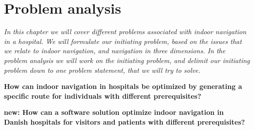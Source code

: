 \chapter{Problem analysis}

\textit{In this chapter we will cover different problems associated with indoor navigation in a hospital. We will formulate our initiating problem, based on the issues that we relate to indoor navigation, and navigation in three dimensions. In the problem analysis we will work on the initiating problem, and delimit our initiating problem down to one problem statement, that we will try to solve.
}

\textbf{How can indoor navigation in hospitals be optimized by generating a specific route for individuals with different prerequisites?}

\textbf{new: How can a software solution optimize indoor navigation in Danish hospitals for visitors and patients with different prerequisites?}







%
